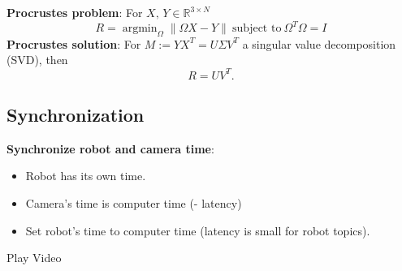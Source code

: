 \documentclass{beamer}
\DeclareMathOperator*{\argmin}{argmin}
\begin{document}
\begin{frame}
\textbf{Procrustes problem}: \newline
For $X,\, Y \in \mathbb{R}^{3 \times N}$
\begin{equation}
R = \argmin_{\Omega} \| \Omega X -Y \|~\text{subject to}~ \Omega^T\Omega = I
\end{equation}
\textbf{Procrustes solution}: \newline
For $M := Y X^T = U \Sigma V^T$ a singular value decomposition (SVD), then
\begin{equation}
R = U V^T .
\end{equation}
\end{frame}

\subsection{Synchronization}

\begin{frame}
\textbf{Synchronize robot and camera time}:
\begin{itemize}
\item Robot has its own time.
\item Camera's time is computer time (- latency)
\item Set robot's time to computer time (latency is small for robot topics).
\end{itemize}
\begin{center}
Play Video
\end{center}
\end{frame}
\end{document}
